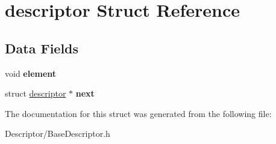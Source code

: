 \hypertarget{structdescriptor}{\section{descriptor Struct Reference}
\label{structdescriptor}
}
\subsection*{Data Fields}
\begin{DoxyCompactItemize}
\item 
\hypertarget{structdescriptor_a5d099b8fda669eea5c5fbd9cd8fd5a7f}{void {\bfseries element}}\label{structdescriptor_a5d099b8fda669eea5c5fbd9cd8fd5a7f}

\item 
\hypertarget{structdescriptor_af629e5c0090b88120fb8b2831c3e6f2a}{struct \hyperlink{structdescriptor}{descriptor} $\ast$ {\bfseries next}}\label{structdescriptor_af629e5c0090b88120fb8b2831c3e6f2a}

\end{DoxyCompactItemize}


The documentation for this struct was generated from the following file\-:\begin{DoxyCompactItemize}
\item 
Descriptor/Base\-Descriptor.\-h\end{DoxyCompactItemize}
